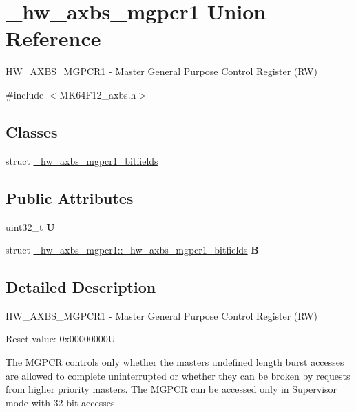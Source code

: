 \hypertarget{union__hw__axbs__mgpcr1}{}\section{\+\_\+hw\+\_\+axbs\+\_\+mgpcr1 Union Reference}
\label{union__hw__axbs__mgpcr1}


H\+W\+\_\+\+A\+X\+B\+S\+\_\+\+M\+G\+P\+C\+R1 -\/ Master General Purpose Control Register (RW)  




{\ttfamily \#include $<$M\+K64\+F12\+\_\+axbs.\+h$>$}

\subsection*{Classes}
\begin{DoxyCompactItemize}
\item 
struct \hyperlink{struct__hw__axbs__mgpcr1_1_1__hw__axbs__mgpcr1__bitfields}{\+\_\+hw\+\_\+axbs\+\_\+mgpcr1\+\_\+bitfields}
\end{DoxyCompactItemize}
\subsection*{Public Attributes}
\begin{DoxyCompactItemize}
\item 
uint32\+\_\+t {\bfseries U}\hypertarget{union__hw__axbs__mgpcr1_adf6b845ce559fb3d4d2693ec0443df43}{}\label{union__hw__axbs__mgpcr1_adf6b845ce559fb3d4d2693ec0443df43}

\item 
struct \hyperlink{struct__hw__axbs__mgpcr1_1_1__hw__axbs__mgpcr1__bitfields}{\+\_\+hw\+\_\+axbs\+\_\+mgpcr1\+::\+\_\+hw\+\_\+axbs\+\_\+mgpcr1\+\_\+bitfields} {\bfseries B}\hypertarget{union__hw__axbs__mgpcr1_adcddbd3a0ea22a723e6b3e05de3afc7c}{}\label{union__hw__axbs__mgpcr1_adcddbd3a0ea22a723e6b3e05de3afc7c}

\end{DoxyCompactItemize}


\subsection{Detailed Description}
H\+W\+\_\+\+A\+X\+B\+S\+\_\+\+M\+G\+P\+C\+R1 -\/ Master General Purpose Control Register (RW) 

Reset value\+: 0x00000000U

The M\+G\+P\+CR controls only whether the master\textquotesingle{}s undefined length burst accesses are allowed to complete uninterrupted or whether they can be broken by requests from higher priority masters. The M\+G\+P\+CR can be accessed only in Supervisor mode with 32-\/bit accesses. 

